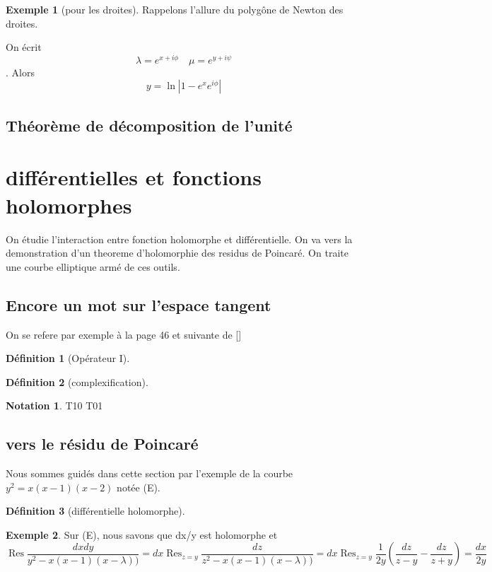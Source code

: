 \documentclass{article}
\theoremstyle{definition} %
\newtheorem{defi}{Définition}
\newtheorem{ex}{Exemple}
\newtheorem{nota}{Notation}
\newcommand{\1}{\mathbb{1}} %
\begin{document}
\begin{ex}[pour les droites]
Rappelons l'allure du polygône de Newton des droites.

On écrit $$\lambda = e^{x+i \phi} \quad \mu=e^{y+i \psi}$$.
Alors $$y=\ln |1 - e^x e^{i \phi}|$$
\end{ex}

\subsection{Théorème de décomposition de l'unité}




\section{différentielles et fonctions holomorphes}

On étudie l'interaction entre fonction holomorphe et différentielle.
On va vers la demonstration d'un theoreme d'holomorphie des residus de Poincaré.
On traite une courbe elliptique armé de ces outils.

\subsection{Encore un mot sur l'espace tangent}

On se refere par exemple à la page 46 et suivante de []


\begin{defi}[Opérateur I]

\end{defi}

\begin{defi}[complexification]

\end{defi}

\begin{nota}
T10 T01
\end{nota}


\subsection{vers le résidu de Poincaré}
Nous sommes guidés dans cette section par l'exemple de la courbe $y^2= x(x-1)(x-2)$ notée (E).

\begin{defi}[différentielle holomorphe]

\end{defi}

\begin{ex}
Sur (E), nous savons que dx/y est holomorphe et
$$\mathop{Res}\frac{dxdy}{y^2-x(x-1)(x-\lambda))}=dx\mathop{Res}_{z=y}\frac{dz}{z^2-x(x-1)(x-\lambda))}=dx\mathop{Res}_{z=y}\frac{1}{2y}\left(\frac{dz}{z-y}-\frac{dz}{z+y}\right)=\frac{dx}{2y}$$

\end{ex}
\end{document}
